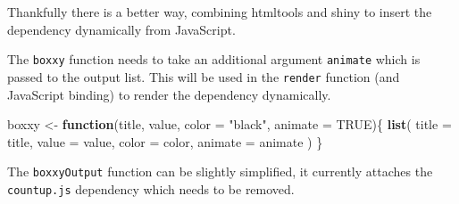 \documentclass[
  10pt,
]{krantz}
\makeatletter
\newenvironment{Shaded}{\begin{snugshade}}{\end{snugshade}}
\newcommand{\CommentTok}[1]{\textcolor[rgb]{0.37,0.37,0.37}{\textit{#1}}}
\newcommand{\ControlFlowTok}[1]{\textcolor[rgb]{0.27,0.27,0.27}{\textbf{#1}}}
\newcommand{\DataTypeTok}[1]{\textcolor[rgb]{0.27,0.27,0.27}{#1}}
\newcommand{\KeywordTok}[1]{\textcolor[rgb]{0.27,0.27,0.27}{\textbf{#1}}}
\newcommand{\NormalTok}[1]{#1}
\newcommand{\OperatorTok}[1]{\textcolor[rgb]{0.43,0.43,0.43}{\textbf{#1}}}
\newcommand{\OtherTok}[1]{\textcolor[rgb]{0.37,0.37,0.37}{#1}}
\newcommand{\StringTok}[1]{\textcolor[rgb]{0.5,0.5,0.5}{#1}}
\newenvironment{kframe}{%
\medskip{}
\setlength{\fboxsep}{.8em}
 \def\at@end@of@kframe{}%
 \ifinner\ifhmode%
  \def\at@end@of@kframe{\end{minipage}}%
  \begin{minipage}{\columnwidth}%
 \fi\fi%
 \def\FrameCommand##1{\hskip\@totalleftmargin \hskip-\fboxsep
 \colorbox{shadecolor}{##1}\hskip-\fboxsep
     \hskip-\linewidth \hskip-\@totalleftmargin \hskip\columnwidth}%
 \MakeFramed {\advance\hsize-\width
   \@totalleftmargin\z@ \linewidth\hsize
   \@setminipage}}%
 {\par\unskip\endMakeFramed%
 \at@end@of@kframe}
\renewenvironment{Shaded}{\begin{kframe}}{\end{kframe}}
\makeatother
\begin{document}
Thankfully there is a better way, combining htmltools and shiny to insert the dependency dynamically from JavaScript.

The \texttt{boxxy} function needs to take an additional argument \texttt{animate} which is passed to the output list. This will be used in the \texttt{render} function (and JavaScript binding) to render the dependency dynamically.

\begin{Shaded}
\begin{Highlighting}[]
\NormalTok{boxxy <{-}}\StringTok{ }\ControlFlowTok{function}\NormalTok{(title, value, }\DataTypeTok{color =} \StringTok{"black"}\NormalTok{, }\DataTypeTok{animate =} \OtherTok{TRUE}\NormalTok{)\{}
  \KeywordTok{list}\NormalTok{(}
    \DataTypeTok{title =}\NormalTok{ title, }\DataTypeTok{value =}\NormalTok{ value, }\DataTypeTok{color =}\NormalTok{ color, }\DataTypeTok{animate =}\NormalTok{ animate}
\NormalTok{  )}
\NormalTok{\}}
\end{Highlighting}
\end{Shaded}

The \texttt{boxxyOutput} function can be slightly simplified, it currently attaches the \texttt{countup.js} dependency which needs to be removed.

\begin{Shaded}
\end{Shaded}
\end{document}
